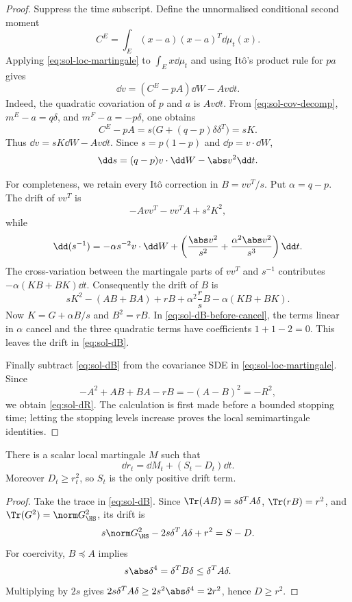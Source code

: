 \documentclass[../main.tex]{subfiles}
\begin{document}
\begin{proof}
Suppress the time subscript.  Define the unnormalised conditional second moment
\[
 C^E=\int_E(x-a)(x-a)^T\dd\mu_t(x).
\]
Applying \eqref{eq:sol-loc-martingale} to $\int_E x\dd\mu_t$ and using It\^o's product rule
for $pa$ gives
\begin{equation}\label{eq:sol-dv}
 \dd v=(C^E-pA)\dd W-Av\dd t.
\end{equation}
Indeed, the quadratic covariation of $p$ and $a$ is $Av\dd t$.  From
\eqref{eq:sol-cov-decomp}, $m^E-a=q\delta$, and $m^F-a=-p\delta$, one obtains
\[
 C^E-pA=s\bigl(G+(q-p)\delta\delta^T\bigr)=sK.
\]
Thus $\dd v=sK\dd W-Av\dd t$.  Since $s=p(1-p)$ and $\dd p=v\cdot\dd W$,
\begin{equation}\label{eq:sol-ds}
 \dd s=(q-p)v\cdot\dd W-\abs v^2\dd t.
\end{equation}

For completeness, we retain every It\^o correction in $B=vv^T/s$.  Put $\alpha=q-p$.
The drift of $vv^T$ is
\[
 -Avv^T-vv^TA+s^2K^2,
\]
while
\[
 \dd(s^{-1})=-\alpha s^{-2}v\cdot\dd W
 +\left(\frac{\abs v^2}{s^2}+\frac{\alpha^2\abs v^2}{s^3}\right)\dd t.
\]
The cross-variation between the martingale parts of $vv^T$ and $s^{-1}$ contributes
$-\alpha(KB+BK)\dd t$.  Consequently the drift of $B$ is
\begin{equation}\label{eq:sol-dB-before-cancel}
 sK^2-(AB+BA)+rB+\alpha^2\frac r sB-\alpha(KB+BK).
\end{equation}
Now $K=G+\alpha B/s$ and $B^2=rB$.  In
\eqref{eq:sol-dB-before-cancel}, the terms linear in $\alpha$ cancel and the three quadratic
terms have coefficients $1+1-2=0$.  This leaves the drift in \eqref{eq:sol-dB}.

Finally subtract \eqref{eq:sol-dB} from the covariance SDE in
\eqref{eq:sol-loc-martingale}.  Since
\[
 -A^2+AB+BA-rB=-(A-B)^2=-R^2,
\]
we obtain \eqref{eq:sol-dR}.  The calculation is first made before a bounded stopping time;
letting the stopping levels increase proves the local semimartingale identities.
\end{proof}

\begin{theorem}[= Theorem~\ref{thm:scalar-riccati}]
\label{thm:sol-scalar-riccati}
There is a scalar local martingale $M$ such that
\[
 \dd r_t=\dd M_t+(S_t-D_t)\dd t.
\]
Moreover $D_t\ge r_t^2$, so $S_t$ is the only positive drift term.
\end{theorem}

\begin{proof}
Take the trace in \eqref{eq:sol-dB}.  Since
$\Tr(AB)=s\delta^TA\delta$, $\Tr(rB)=r^2$, and
$\Tr(G^2)=\norm G_\HS^2$, its drift is
\[
 s\norm G_\HS^2-2s\delta^TA\delta+r^2=S-D.
\]
For coercivity, $B\preceq A$ implies
\[
 s\abs\delta^4=\delta^TB\delta\le\delta^TA\delta.
\]
Multiplying by $2s$ gives
$2s\delta^TA\delta\ge2s^2\abs\delta^4=2r^2$, hence $D\ge r^2$.
\end{proof}
\end{document}
